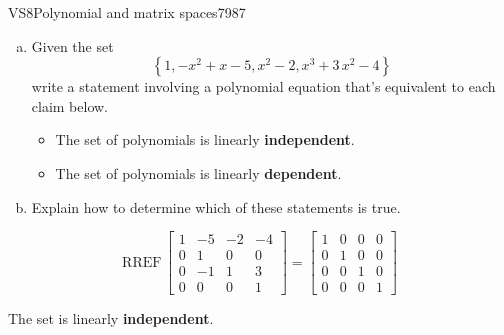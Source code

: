 \begin{exercise}{VS8}{Polynomial and matrix spaces}{7987} 
\begin{exerciseStatement} 

\begin{enumerate}[(a)]
\item  

 Given the set \[\left\{ 1 , -x^{2} + x - 5 , x^{2} - 2 , x^{3} + 3 \, x^{2} - 4 \right\}\] write a statement involving a polynomial equation that's equivalent to each claim below. 

 

\begin{itemize}
\item  

 The set of polynomials is linearly \textbf{independent}. 

 
\item  

 The set of polynomials is linearly \textbf{dependent}. 

 
\end{itemize}

     
\item  

 Explain how to determine which of these statements is true. 

 
\end{enumerate}

     \end{exerciseStatement}
 \begin{exerciseAnswer} 

 \[
\mathrm{RREF}\, \left[\begin{array}{cccc}
1 & -5 & -2 & -4 \\
0 & 1 & 0 & 0 \\
0 & -1 & 1 & 3 \\
0 & 0 & 0 & 1
\end{array}\right] = \left[\begin{array}{cccc}
1 & 0 & 0 & 0 \\
0 & 1 & 0 & 0 \\
0 & 0 & 1 & 0 \\
0 & 0 & 0 & 1
\end{array}\right]
            \] 

 

 The set is linearly \textbf{independent}. 

 \end{exerciseAnswer}
 \end{exercise}


